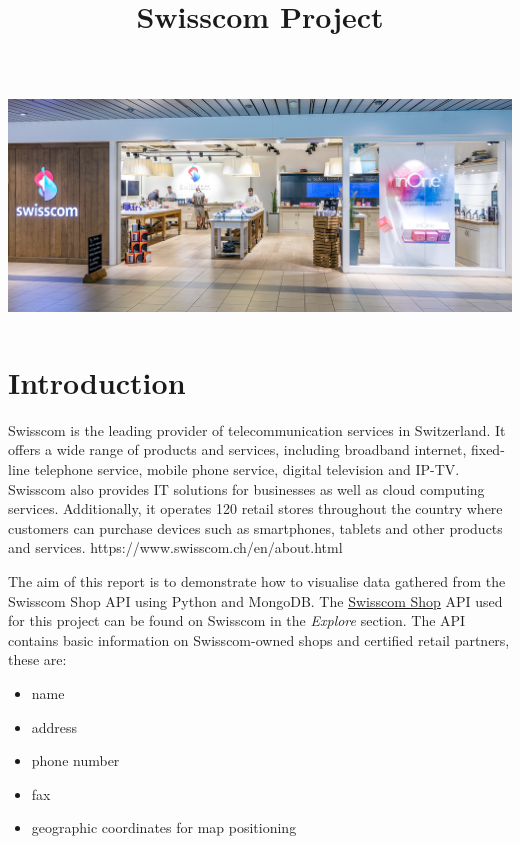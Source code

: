 \documentclass[11pt]{article}
\title{Swisscom Project}
\begin{document}
    

    
\includegraphics[width=16cm, height=6cm]{swisscom_shop.png}
 

 \tableofcontents{}

\pagebreak

\hypertarget{introduction}{%
\section{Introduction}\label{introduction}}

    Swisscom is the leading provider of telecommunication services in
Switzerland. It offers a wide range of products and services, including
broadband internet, fixed-line telephone service, mobile phone service,
digital television and IP-TV. Swisscom also provides IT solutions for
businesses as well as cloud computing services. Additionally, it
operates 120 retail stores throughout the country where customers can
purchase devices such as smartphones, tablets and other products and
services. https://www.swisscom.ch/en/about.html

    

    The aim of this report is to demonstrate how to visualise data gathered
from the Swisscom Shop API using Python and MongoDB. The
\href{https://data.swisscom.com/explore/dataset/swisscom-shops-de/information/?disjunctive.address_city\&disjunctive.address_zip\&sort=address_shopname\&location=3,26.27104,5.2231}{Swisscom
Shop} API used for this project can be found on Swisscom in the
\emph{Explore} section. The API contains basic information on
Swisscom-owned shops and certified retail partners, these are: 
\begin{itemize}
\item name
\item address
\item phone number
\item fax
\item geographic coordinates for map positioning
\end{itemize}
\end{document}
